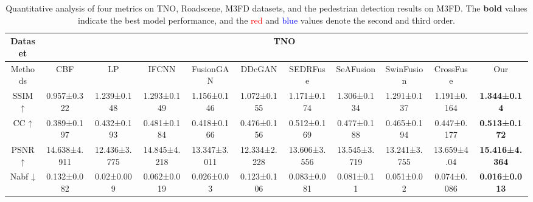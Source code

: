 \documentclass[journal]{IEEEtran}
\begin{document}
\begin{table*}[]
\centering
\caption{{Quantitative analysis of four metrics on TNO, Roadscene, M3FD datasets, and the pedestrian detection results on M3FD. The \textbf{bold} values indicate the best model performance, and the \textcolor{red}{red} and \textcolor{blue}{blue} values denote the second and third order.}}
\setlength{\tabcolsep}{0.5 mm}
\renewcommand\arraystretch{1.1}{
\begin{tabular}{ccccccccccc}
\hline
Dataset            & \multicolumn{10}{c}{TNO}                                                                                                                                                                                                                                                                                                               \\ \hline
Methods            & CBF                                 & LP                                 & IFCNN                               & FusionGAN                           & DDcGAN       & SEDRFuse                           & SeAFusion                          & SwinFusion                         & CrossFuse   & Our                                 \\ \hline
SSIM ↑             & 0.957±0.322                         & 1.239±0.148                        & {\color[HTML]{00B0F0} 1.293±0.149}  & 1.156±0.146                         & 1.072±0.155  & 1.171±0.174                        & {\color[HTML]{FF0000} 1.306±0.134} & 1.291±0.137                        & 1.191±0.164 & \textbf{1.344±0.14}                 \\
CC    ↑            & 0.389±0.197                         & 0.432±0.193                        & {\color[HTML]{00B0F0} 0.481±0.184}  & 0.418±0.166                         & 0.476±0.156  & {\color[HTML]{FF0000} 0.512±0.169} & 0.477±0.188                        & 0.465±0.194                        & 0.447±0.177 & \textbf{0.513±0.172}                \\
PSNR↑              & {\color[HTML]{00B0F0} 14.638±4.911} & 12.436±3.775                       & {\color[HTML]{FF0000} 14.845±4.218} & 13.347±3.011                        & 12.334±2.228 & 13.606±3.556                       & 13.545±3.719                       & 13.241±3.755                       & 13.659±4.04 & \textbf{15.416±4.364}               \\
Nabf ↓             & 0.132±0.082                         & {\color[HTML]{FF0000} 0.02±0.009}  & 0.062±0.019                         & {\color[HTML]{00B0F0} 0.026±0.03}   & 0.123±0.106  & 0.083±0.081                        & 0.081±0.11                         & 0.051±0.02                         & 0.074±0.086 & \textbf{0.016±0.013}                \\ \hline

\end{tabular}}
\end{table*}
\end{document}
